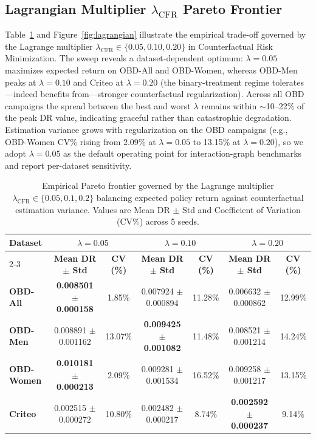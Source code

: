 \documentclass[preprint,12pt,3p]{elsarticle}
\begin{document}
\subsection{Lagrangian Multiplier $\lambda_{\mathrm{CFR}}$ Pareto Frontier}
Table~\ref{tab:lagrangian_cfr} and Figure~\ref{fig:lagrangian} illustrate the empirical trade-off governed by the Lagrange multiplier $\lambda_{\mathrm{CFR}} \in \{0.05, 0.10, 0.20\}$ in Counterfactual Risk Minimization. The sweep reveals a dataset-dependent optimum: $\lambda = 0.05$ maximizes expected return on OBD-All and OBD-Women, whereas OBD-Men peaks at $\lambda = 0.10$ and Criteo at $\lambda = 0.20$ (the binary-treatment regime tolerates---indeed benefits from---stronger counterfactual regularization). Across all OBD campaigns the spread between the best and worst $\lambda$ remains within $\sim$10--22\% of the peak DR value, indicating graceful rather than catastrophic degradation. Estimation variance grows with regularization on the OBD campaigns (e.g., OBD-Women CV\% rising from 2.09\% at $\lambda=0.05$ to 13.15\% at $\lambda=0.20$), so we adopt $\lambda = 0.05$ as the default operating point for interaction-graph benchmarks and report per-dataset sensitivity.

\begin{table}[t]
\centering
\small
\caption{Empirical Pareto frontier governed by the Lagrange multiplier $\lambda_{\mathrm{CFR}} \in \{0.05, 0.1, 0.2\}$ balancing expected policy return against counterfactual estimation variance. Values are Mean DR $\pm$ Std and Coefficient of Variation (CV\%) across 5 seeds.}
\label{tab:lagrangian_cfr}
\begin{tabular*}{\textwidth}{@{\extracolsep{\fill}}lcccccc@{}}
\toprule
\multirow{2}{*}{\textbf{Dataset}} & \multicolumn{2}{c}{$\lambda = 0.05$} & \multicolumn{2}{c}{$\lambda = 0.10$} & \multicolumn{2}{c}{$\lambda = 0.20$} \\
\cmidrule{2-3} \cmidrule{4-5} \cmidrule{6-7}
 & \textbf{Mean DR $\pm$ Std} & \textbf{CV (\%)} & \textbf{Mean DR $\pm$ Std} & \textbf{CV (\%)} & \textbf{Mean DR $\pm$ Std} & \textbf{CV (\%)} \\
\midrule
\textbf{OBD-All}   & \textbf{0.008501 $\pm$ 0.000158} & 1.85\% & 0.007924 $\pm$ 0.000894 & 11.28\% & 0.006632 $\pm$ 0.000862 & 12.99\% \\
\textbf{OBD-Men}   & 0.008891 $\pm$ 0.001162 & 13.07\% & \textbf{0.009425 $\pm$ 0.001082} & 11.48\% & 0.008521 $\pm$ 0.001214 & 14.24\% \\
\textbf{OBD-Women} & \textbf{0.010181 $\pm$ 0.000213} & 2.09\% & 0.009281 $\pm$ 0.001534 & 16.52\% & 0.009258 $\pm$ 0.001217 & 13.15\% \\
\textbf{Criteo}    & 0.002515 $\pm$ 0.000272 & 10.80\% & 0.002482 $\pm$ 0.000217 & 8.74\% & \textbf{0.002592 $\pm$ 0.000237} & 9.14\% \\
\bottomrule
\end{tabular*}
\end{table}
\end{document}
